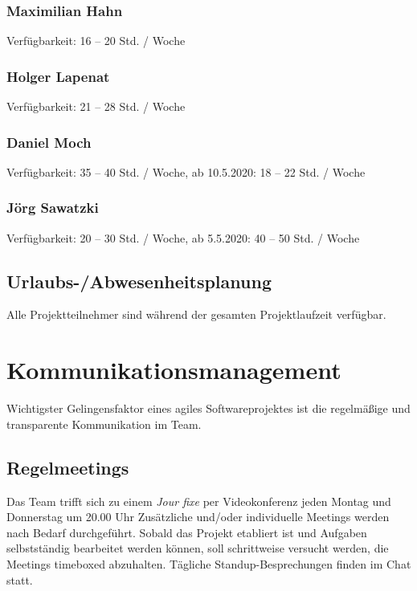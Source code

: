 \documentclass[a4paper,11pt,listof=numbered,glossary=totoc,parskip=half,toc=bib]{scrreprt}
\begin{document}
\subsection{Maximilian Hahn}

Verfügbarkeit: 16 -- 20 Std. / Woche

\subsection{Holger Lapenat}

Verfügbarkeit: 21 -- 28 Std. / Woche

\subsection{Daniel Moch}

Verfügbarkeit: 35 -- 40 Std. / Woche, ab 10.5.2020: 18 -- 22 Std. / Woche

\subsection{Jörg Sawatzki}

Verfügbarkeit: 20 -- 30 Std. / Woche, ab 5.5.2020: 40 -- 50 Std. / Woche


\section{Urlaubs-/Abwesenheitsplanung}
Alle Projektteilnehmer sind während der gesamten Projektlaufzeit verfügbar.

\newpage
	\chapter{Kommunikationsmanagement}
	\label{sec:kommunikationsmanagement}
	
Wichtigster Gelingensfaktor eines agiles Softwareprojektes ist die regelmäßige und transparente Kommunikation im Team.

\section{Regelmeetings}

Das Team trifft sich zu einem \textit{Jour fixe} per Videokonferenz jeden Montag und Donnerstag um 20.00 Uhr
Zusätzliche und/oder individuelle Meetings werden nach Bedarf durchgeführt.
Sobald das Projekt etabliert ist und Aufgaben selbstständig bearbeitet werden können, soll schrittweise versucht werden, die Meetings timeboxed abzuhalten.
Tägliche Standup-Besprechungen finden im Chat statt. 
\end{document}

